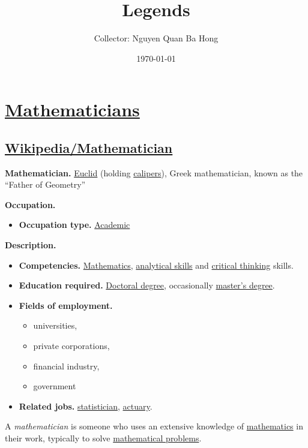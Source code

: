 \documentclass{book}
\title{Legends}
\author{Collector: Nguyen Quan Ba Hong}
\date{\today}
\numberwithin{equation}{section}
\begin{document}
\maketitle
\setcounter{secnumdepth}{6}
\setcounter{tocdepth}{6}
\tableofcontents


\part{\href{https://en.wikipedia.org/wiki/Mathematician}{Mathematicians}}

\chapter{\href{https://en.wikipedia.org/wiki/Mathematician}{Wikipedia/Mathematician}}

\textbf{Mathematician.} \href{https://en.wikipedia.org/wiki/Euclid}{Euclid} (holding \href{https://en.wikipedia.org/wiki/Calipers}{calipers}), Greek mathematician, known as the ``Father of Geometry''

\noindent
\textbf{Occupation.}
\begin{itemize}
    \item \textbf{Occupation type.} \href{https://en.wikipedia.org/wiki/Academic}{Academic}
\end{itemize}
\textbf{Description.}
\begin{itemize}
    \item \textbf{Competencies.} \href{https://en.wikipedia.org/wiki/Mathematics}{Mathematics}, \href{https://en.wikipedia.org/wiki/Analytical_skill}{analytical skills} and \href{https://en.wikipedia.org/wiki/Critical_thinking}{critical thinking} skills.
    \item \textbf{Education required.} \href{https://en.wikipedia.org/wiki/Doctoral_degree}{Doctoral degree}, occasionally \href{https://en.wikipedia.org/wiki/Master%27s_degree}{master's degree}.
    \item \textbf{Fields of employment.}
    \begin{itemize}
        \item universities,
        \item private corporations,
        \item financial industry,
        \item government
    \end{itemize}
    \item \textbf{Related jobs.} \href{https://en.wikipedia.org/wiki/Statistician}{statistician}, \href{https://en.wikipedia.org/wiki/Actuary}{actuary}.
\end{itemize}
A \textit{mathematician} is someone who uses an extensive knowledge of \href{https://en.wikipedia.org/wiki/Mathematics}{mathematics} in their work, typically to solve \href{https://en.wikipedia.org/wiki/Mathematical_problem}{mathematical problems}.
\end{document}
